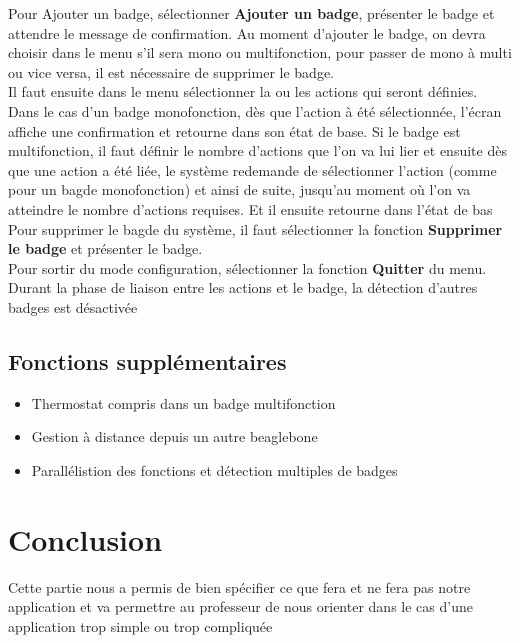 Pour Ajouter un badge, sélectionner \textbf{Ajouter un badge}, présenter le badge et attendre le message de confirmation. Au moment d'ajouter le badge, on devra choisir dans le menu s'il sera mono ou multifonction, pour passer de mono à multi ou vice versa, il est nécessaire de supprimer le badge.\\
Il faut ensuite dans le menu sélectionner la ou les actions qui seront définies. \\
Dans le cas d'un badge monofonction, dès que l'action à été sélectionnée, l'écran affiche une confirmation et retourne dans son état de base. 
Si le badge est multifonction, il faut définir le nombre d'actions que l'on va lui lier et ensuite dès que une action a été liée, le système redemande de sélectionner l'action (comme pour un bagde monofonction) et ainsi de suite, jusqu'au moment où l'on va atteindre le nombre d'actions requises. Et il ensuite retourne dans l'état de bas\\
Pour supprimer le bagde du système, il faut sélectionner la fonction \textbf{Supprimer le badge} et présenter le badge.\\
Pour sortir du mode configuration, sélectionner la fonction \textbf{Quitter} du menu.
Durant la phase de liaison entre les actions et le badge, la détection d'autres badges est désactivée


\subsection{Fonctions supplémentaires}
\begin{itemize}
   \item Thermostat compris dans un badge multifonction
   \item Gestion à distance depuis un autre beaglebone
   \item Parallélistion des fonctions et détection multiples de badges
\end{itemize}

\section{Conclusion}
Cette partie nous a permis de bien spécifier ce que fera et ne fera pas notre application et va permettre au professeur de nous orienter dans le cas d'une application trop simple ou trop compliquée

